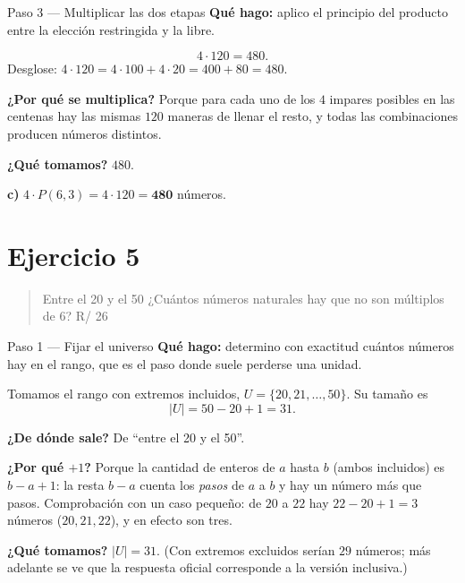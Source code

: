 \documentclass[11pt]{article}
\begin{document}
\begin{paso}{Paso 3 --- Multiplicar las dos etapas}
\textbf{Qué hago:} aplico el principio del producto entre la elección restringida y la libre.

\[
4\cdot 120 = 480 .
\]
Desglose: $4\cdot 120 = 4\cdot 100 + 4\cdot 20 = 400+80 = 480$.

\textbf{¿Por qué se multiplica?} Porque para cada uno de los $4$ impares posibles en las centenas hay las mismas $120$ maneras de llenar el resto, y todas las combinaciones producen números distintos.

\textbf{¿Qué tomamos?} $480$.
\end{paso}

\begin{resp}
\textbf{c)} $4\cdot P(6,3) = 4\cdot 120 = \mathbf{480}$ números.
\end{resp}

\section*{Ejercicio 5}

\begin{quote}
Entre el 20 y el 50 ¿Cuántos números naturales hay que no son múltiplos de 6? \hfill R/ 26
\end{quote}

\begin{paso}{Paso 1 --- Fijar el universo}
\textbf{Qué hago:} determino con exactitud cuántos números hay en el rango, que es el paso donde suele perderse una unidad.

Tomamos el rango con extremos incluidos, $U=\{20,21,\dots,50\}$. Su tamaño es
\[
|U| = 50-20+1 = 31 .
\]

\textbf{¿De dónde sale?} De ``entre el 20 y el 50''.

\textbf{¿Por qué $+1$?} Porque la cantidad de enteros de $a$ hasta $b$ (ambos incluidos) es $b-a+1$: la resta $b-a$ cuenta los \emph{pasos} de $a$ a $b$ y hay un número más que pasos. Comprobación con un caso pequeño: de $20$ a $22$ hay $22-20+1=3$ números ($20,21,22$), y en efecto son tres.

\textbf{¿Qué tomamos?} $|U| = 31$. (Con extremos excluidos serían $29$ números; más adelante se ve que la respuesta oficial corresponde a la versión inclusiva.)
\end{paso}
\end{document}
